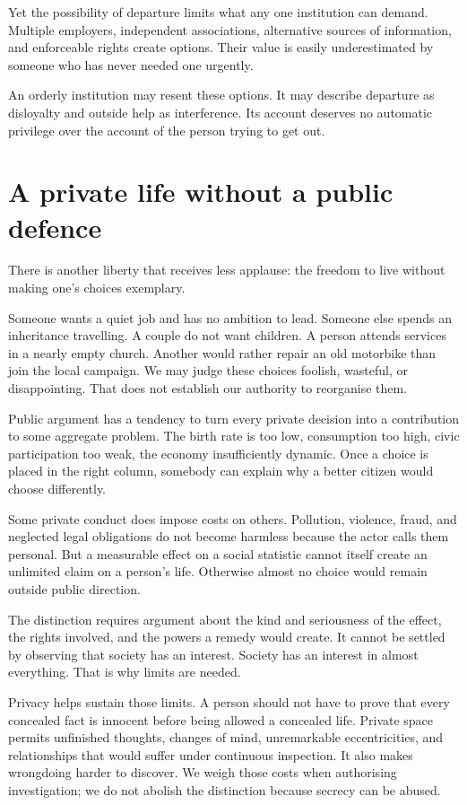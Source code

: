 \documentclass[12pt,a4paper]{book}
\begin{document}
Yet the possibility of departure limits what any one institution can demand. Multiple employers, independent associations, alternative sources of information, and enforceable rights create options. Their value is easily underestimated by someone who has never needed one urgently.

An orderly institution may resent these options. It may describe departure as disloyalty and outside help as interference. Its account deserves no automatic privilege over the account of the person trying to get out.

\section*{A private life without a public defence}

There is another liberty that receives less applause: the freedom to live without making one's choices exemplary.

Someone wants a quiet job and has no ambition to lead. Someone else spends an inheritance travelling. A couple do not want children. A person attends services in a nearly empty church. Another would rather repair an old motorbike than join the local campaign. We may judge these choices foolish, wasteful, or disappointing. That does not establish our authority to reorganise them.

Public argument has a tendency to turn every private decision into a contribution to some aggregate problem. The birth rate is too low, consumption too high, civic participation too weak, the economy insufficiently dynamic. Once a choice is placed in the right column, somebody can explain why a better citizen would choose differently.

Some private conduct does impose costs on others. Pollution, violence, fraud, and neglected legal obligations do not become harmless because the actor calls them personal. But a measurable effect on a social statistic cannot itself create an unlimited claim on a person's life. Otherwise almost no choice would remain outside public direction.

The distinction requires argument about the kind and seriousness of the effect, the rights involved, and the powers a remedy would create. It cannot be settled by observing that society has an interest. Society has an interest in almost everything. That is why limits are needed.

Privacy helps sustain those limits. A person should not have to prove that every concealed fact is innocent before being allowed a concealed life. Private space permits unfinished thoughts, changes of mind, unremarkable eccentricities, and relationships that would suffer under continuous inspection. It also makes wrongdoing harder to discover. We weigh those costs when authorising investigation; we do not abolish the distinction because secrecy can be abused.
\end{document}
